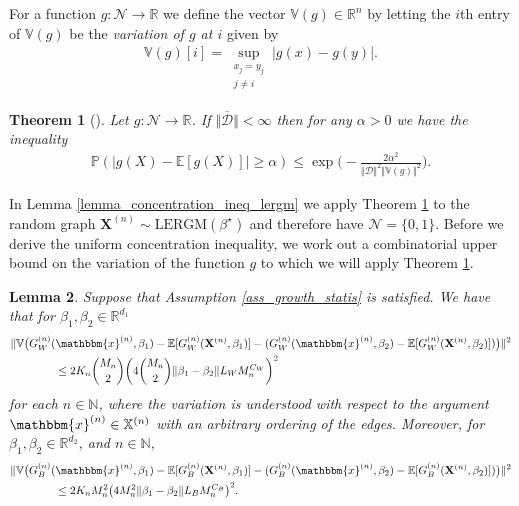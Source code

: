 \documentclass{article}
\newtheorem{Theorem}{Theorem}[section]
\newtheorem{Lemma}[Theorem]{Lemma}
\begin{document}
For a function $g:\mathcal{N} \rightarrow \mathbb{R}$ we define  the vector $\mathbb{V}(g) \in \mathbb{R}^n$ by letting the $i$th entry of $\mathbb{V}(g)$ be the {\it variation of $g$ at $i$}  given by 
\begin{align*}
    \mathbb{V}(g)[i] = \sup_{\substack{x_j = y_j \\ j \neq i}} \vert g(x) - g(y) \vert.
\end{align*}
\begin{Theorem}[{\cite[Theorem 1]{chazottes2007concentration}}] \label{general_concentration_ineq}
    Let  $g:\mathcal{N} \rightarrow \mathbb{R}$. If $ \Vert \overline{\mathcal{D}} \Vert < \infty $ then for any $\alpha>0$ we have the inequality
    \begin{align*}
        \mathbb{P}( \vert g(X) - \mathbb{E}[g(X)] \vert \geq \alpha   ) \leq \exp\bigg( - \frac{2\alpha^2}{\Vert \overline{\mathcal{D}} \Vert^2 \Vert \mathbb{V}(g)\Vert^2} \bigg).
    \end{align*}
\end{Theorem}
In Lemma \ref{lemma_concentration_ineq_lergm} we apply Theorem \ref{general_concentration_ineq} to the random graph $\mathbf{X}^{(n)} \sim \mathrm{LERGM}(\beta^{\star})$ and therefore have $\mathcal{N}= \{0,1\}$. Before we derive the uniform concentration inequality, we work out a combinatorial upper bound on the variation of the function $g$ to which we will apply Theorem  \ref{general_concentration_ineq}.
\begin{Lemma} \label{lemma_variation}
    Suppose that Assumption \ref{ass_growth_statis} is satisfied. We have that for $\beta_1,\beta_2 \in \mathbb{R}^{d_1}$
    \begin{align*}
        &\Vert \mathbb{V}\big(G_W^{(n)}(\mathbbm{x}^{(n)},\beta_1) - \mathbb{E}[G_W^{(n)}(\mathbf{X}^{(n)},\beta_1)] - (G_W^{(n)}(\mathbbm{x}^{(n)},\beta_2) - \mathbb{E}[G_W^{(n)}(\mathbf{X}^{(n)},\beta_2)]) \big) \Vert^2 \\
        & \qquad \qquad \leq 2K_n\binom{M_n}{2} \bigg( 4 \binom{M_n}{2} \Vert \beta_1 - \beta_2 \Vert L_W M_n^{C_W}  \bigg)^2
    \end{align*}
    for each $n \in \mathbb{N}$, where the variation is  understood with respect to the argument $\mathbbm{x}^{(n)} \in \mathbb{X}^{(n)}$ with an arbitrary ordering of the edges. Moreover, for $\beta_1,\beta_2 \in \mathbb{R}^{d_2}$,  and $n \in \mathbb{N}$,
    \begin{align*}
        &\Vert \mathbb{V}\big(G_B^{(n)}(\mathbbm{x}^{(n)},\beta_1) - \mathbb{E}[G_B^{(n)}(\mathbf{X}^{(n)},\beta_1)] - (G_B^{(n)}(\mathbbm{x}^{(n)},\beta_2) - \mathbb{E}[G_B^{(n)}(\mathbf{X}^{(n)},\beta_2)]) \big) \Vert^2 \\
        & \qquad \qquad \leq 2K_nM_n^2 \big( 4 M_n^2 \Vert \beta_1 - \beta_2 \Vert L_B M_n^{C_B}  \big)^2. 
    \end{align*}

\end{Lemma}
\end{document}
